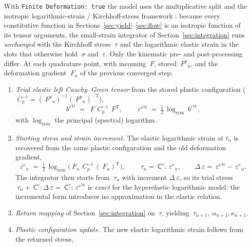 \documentclass[12pt]{article}
\newcommand{\transpose}[1]{{#1}^{\mathrm{T}}}
\newcommand{\stress}{~\sigma}
\newcommand{\kirch}{~\tau}
\newcommand{\backstress}{~\alpha}
\newcommand{\estrain}{{~\varepsilon^e}}
\newcommand{\strainincr}{\Delta~\varepsilon}
\newcommand{\Fdef}{~F}
\newcommand{\Fplas}{{~F^p}}
\newcommand{\bee}{{~b^e}}
\newcommand{\Celast}{{~{\mathsf C}^e}}
\begin{document}
With \texttt{Finite Deformation: true} the model uses the
multiplicative split and the isotropic logarithmic-strain /
Kirchhoff-stress framework
\citep{Simo:1992}: because every constitutive function in
Sections~\ref{sec:yield}--\ref{sec:flow} is an isotropic function of
its tensor arguments, the small-strain integrator of
Section~\ref{sec:integration} runs \emph{unchanged} with the
Kirchhoff stress $\kirch$ and the logarithmic elastic strain in the
slots that otherwise hold $\stress$ and $~\varepsilon$. Only the
kinematic pre- and post-processing differ. At each quadrature point,
with incoming $\Fdef$, stored $\Fplas_n$, and the deformation
gradient $\Fdef_n$ of the previous converged step:
\begin{enumerate}
\item \emph{Trial elastic left Cauchy--Green tensor} from the stored
      plastic configuration
      ($~C_p^{-1} = (\Fplas_n)^{-1}(\Fplas_n)^{-\mathrm{T}}$),
      \begin{equation}
        \bee^{\mathrm{tr}} \;=\; \Fdef\,~C_p^{-1}\,\transpose{\Fdef},
        \qquad
        \estrain^{\mathrm{tr}} \;=\;
        \tfrac{1}{2}\,\log_{\mathrm{sym}}\bee^{\mathrm{tr}},
      \end{equation}
      with $\log_{\mathrm{sym}}$ the principal (spectral) logarithm.
\item \emph{Starting stress and strain increment.} The elastic
      logarithmic strain at $t_n$ is recovered from the same plastic
      configuration and the old deformation gradient,
      \begin{equation}
        \estrain_n \;=\;
        \tfrac{1}{2}\,\log_{\mathrm{sym}}
        \bigl(\Fdef_n\,~C_p^{-1}\,\transpose{(\Fdef_n)}\bigr),
        \qquad
        \kirch_n = \Celast : \estrain_n,
        \qquad
        \strainincr = \estrain^{\mathrm{tr}} - \estrain_n .
      \end{equation}
      The integrator then starts from $\kirch_n$ with increment
      $\strainincr$, so its trial stress
      $\kirch_n + \Celast:\strainincr = \Celast:\estrain^{\mathrm{tr}}$
      is \emph{exact} for the hyperelastic logarithmic model: the
      incremental form introduces no approximation in the elastic
      relation.
\item \emph{Return mapping} of Section~\ref{sec:integration} on
      $\kirch$, yielding $\kirch_{n+1}, \backstress_{n+1},
      \kappa_{n+1}$.
\item \emph{Plastic configuration update.} The new elastic
      logarithmic strain follows from the returned stress,

\end{enumerate}
\end{document}
